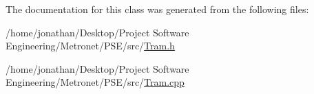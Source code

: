 The documentation for this class was generated from the following files\+:\begin{DoxyCompactItemize}
\item 
/home/jonathan/\+Desktop/\+Project Software Engineering/\+Metronet/\+P\+S\+E/src/\hyperlink{_tram_8h}{Tram.\+h}\item 
/home/jonathan/\+Desktop/\+Project Software Engineering/\+Metronet/\+P\+S\+E/src/\hyperlink{_tram_8cpp}{Tram.\+cpp}\end{DoxyCompactItemize}

